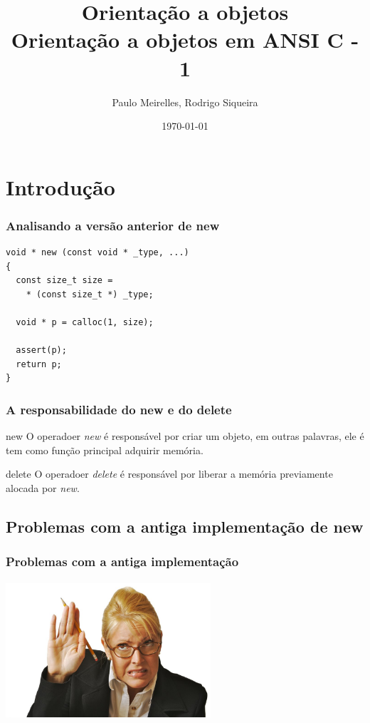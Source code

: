 \documentclass{beamer}
\title{Orientação a objetos\\ \textbf{Orientação a objetos em ANSI C - 1}}
\author{Paulo Meirelles, Rodrigo Siqueira}
\date{\today}
\institute{\textbf{Universidade de Brasília - Faculdade do Gama}}
\begin{document}
\begin{frame}
  \titlepage
\end{frame}
  
\section{Introdução}
\begin{frame}[fragile]
  \frametitle{Analisando a versão anterior de new}
    \begin{lstlisting} 
void * new (const void * _type, ...)
{
  const size_t size = 
    * (const size_t *) _type;

  void * p = calloc(1, size);

  assert(p);
  return p;
}
    \end{lstlisting}

\end{frame}

\begin{frame}
  \frametitle{A responsabilidade do new e do delete}
  \pause
  \begin{block}{new}
    O operadoer \textit{new} é responsável por criar um objeto, em outras 
    palavras, ele é tem como função principal adquirir memória.
  \end{block}
  
  \pause
  \begin{block}{delete}
    O operadoer \textit{delete} é responsável por liberar a memória previamente 
    alocada por \textit{new}.
  \end{block}

\end{frame}

\subsection{Problemas com a antiga implementação de new}

\begin{frame}
  \frametitle{Problemas com a antiga implementação}
  \begin{center}
    \includegraphics[height = 2in, width = 3in]{image/q1.jpg}
  \end{center}
\end{frame}
\end{document}
